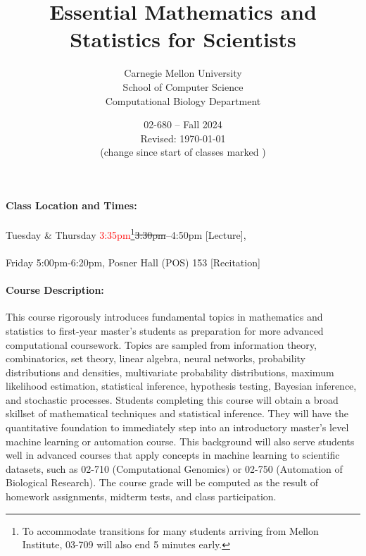 \documentclass[12pt]{scrartcl}
\title{\large Essential Mathematics and Statistics for Scientists}\let\Title\@title
\subtitle{
{\small
Carnegie Mellon University\\
School of Computer Science\\
Computational Biology Department
}
\vskip-1cm}
\date{\large 02-680 -- Fall 2024\\ \vspace{1em}\small Revised: \today\\(change since start of classes marked \change{}{in orange})}
\author{}
\begin{document}

\maketitle





\paragraph{Class Location and Times:\\} 
\hspace*{2em}Tuesday \& Thursday \textcolor{red}{3:35pm}\footnote{To accommodate transitions for many students arriving from Mellon Institute, 03-709 will also end 5 minutes early.}\sout{3:30pm}--4:50pm [Lecture], \\ \\
\hspace*{3em}Friday 5:00pm-6:20pm, Posner Hall (POS) 153 [Recitation]



\paragraph{Course Description:} 
This course rigorously introduces fundamental topics in mathematics and statistics 
to first-year master's students as preparation for more advanced computational coursework. 
Topics are sampled from information theory, 
combinatorics, set theory, linear algebra, neural networks, probability distributions and densities, 
multivariate probability distributions, maximum likelihood estimation, statistical inference, hypothesis testing, 
Bayesian inference, and stochastic processes. 
Students completing this course will obtain a broad skillset of mathematical techniques and 
statistical inference. %
They will have the quantitative foundation to immediately step into 
an introductory master's level machine learning or automation course. 
This background will also serve students well in advanced courses that apply concepts in 
machine learning to scientific datasets, such as 
02-710 (Computational Genomics) or 02-750 (Automation of Biological Research). 
The course grade will be computed as the result of homework assignments, midterm tests, and class participation.
\end{document}
